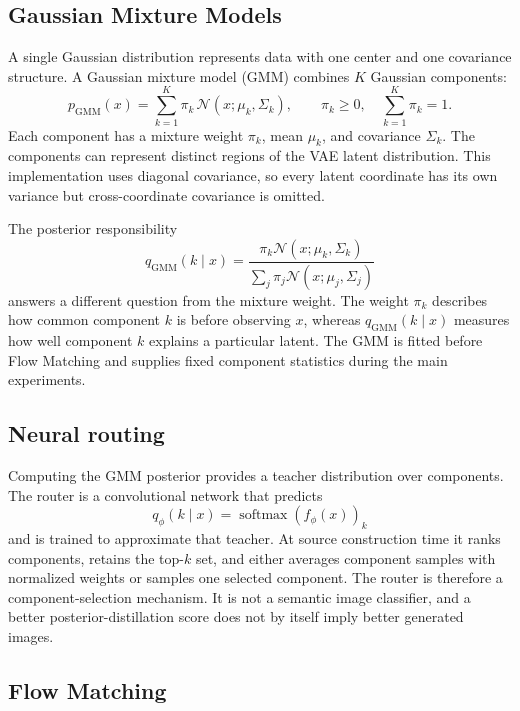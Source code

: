 \documentclass[11pt,a4paper]{article}
\begin{document}
\subsection{Gaussian Mixture Models}

A single Gaussian distribution represents data with one center and one
covariance structure. A Gaussian mixture model (GMM) combines \(K\) Gaussian
components:
\[
 p_{\mathrm{GMM}}(x)
 =\sum_{k=1}^{K}\pi_k\,\mathcal N(x;\mu_k,\Sigma_k),
 \qquad
 \pi_k\ge 0,\quad \sum_{k=1}^{K}\pi_k=1.
\]
Each component has a mixture weight \(\pi_k\), mean \(\mu_k\), and covariance
\(\Sigma_k\). The components can represent distinct regions of the VAE latent
distribution. This implementation uses diagonal covariance, so every latent
coordinate has its own variance but cross-coordinate covariance is omitted.

The posterior responsibility
\[
 q_{\mathrm{GMM}}(k\mid x)
 =
 \frac{\pi_k\mathcal N(x;\mu_k,\Sigma_k)}
 {\sum_j\pi_j\mathcal N(x;\mu_j,\Sigma_j)}
\]
answers a different question from the mixture weight. The weight \(\pi_k\)
describes how common component \(k\) is before observing \(x\), whereas
\(q_{\mathrm{GMM}}(k\mid x)\) measures how well component \(k\) explains a
particular latent. The GMM is fitted before Flow Matching and supplies fixed
component statistics during the main experiments.

\subsection{Neural routing}

Computing the GMM posterior provides a teacher distribution over components.
The router is a convolutional network that predicts
\[
 q_\phi(k\mid x)=\operatorname{softmax}(f_\phi(x))_k
\]
and is trained to approximate that teacher. At source construction time it
ranks components, retains the top-\(k\) set, and either averages component
samples with normalized weights or samples one selected component. The router
is therefore a component-selection mechanism. It is not a semantic image
classifier, and a better posterior-distillation score does not by itself imply
better generated images.

\subsection{Flow Matching}
\end{document}
